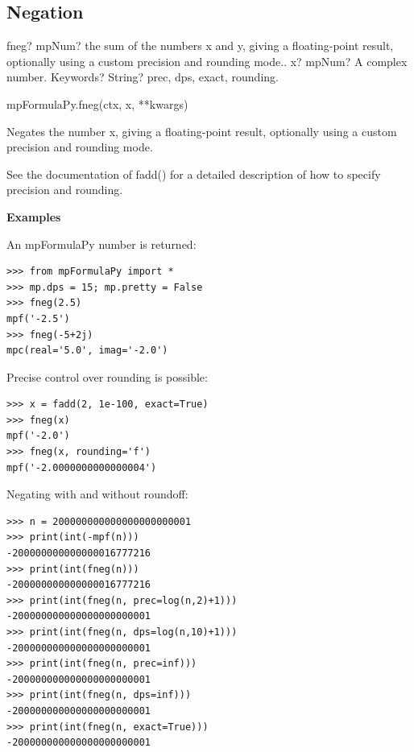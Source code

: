\subsection{Negation}

\begin{mpFunctionsExtract}
	\mpFunctionTwo
	{fneg? mpNum? the sum of the numbers x and y, giving a floating-point result, optionally using a custom precision and rounding mode..}
	{x? mpNum? A complex number.}
	{Keywords? String? prec, dps, exact, rounding.}	
\end{mpFunctionsExtract}

\vspace{0.3cm}

mpFormulaPy.fneg(ctx, x, **kwargs)

\vpara
Negates the number x, giving a floating-point result, optionally using a custom precision and rounding mode.

\vpara
See the documentation of fadd() for a detailed description of how to specify precision and rounding.

\vpara
\textbf{Examples}

An mpFormulaPy number is returned:

\begin{lstlisting}
>>> from mpFormulaPy import *
>>> mp.dps = 15; mp.pretty = False
>>> fneg(2.5)
mpf('-2.5')
>>> fneg(-5+2j)
mpc(real='5.0', imag='-2.0')
\end{lstlisting}


Precise control over rounding is possible:

\begin{lstlisting}
>>> x = fadd(2, 1e-100, exact=True)
>>> fneg(x)
mpf('-2.0')
>>> fneg(x, rounding='f')
mpf('-2.0000000000000004')
\end{lstlisting}


Negating with and without roundoff:

\begin{lstlisting}
>>> n = 200000000000000000000001
>>> print(int(-mpf(n)))
-200000000000000016777216
>>> print(int(fneg(n)))
-200000000000000016777216
>>> print(int(fneg(n, prec=log(n,2)+1)))
-200000000000000000000001
>>> print(int(fneg(n, dps=log(n,10)+1)))
-200000000000000000000001
>>> print(int(fneg(n, prec=inf)))
-200000000000000000000001
>>> print(int(fneg(n, dps=inf)))
-200000000000000000000001
>>> print(int(fneg(n, exact=True)))
-200000000000000000000001
\end{lstlisting}




